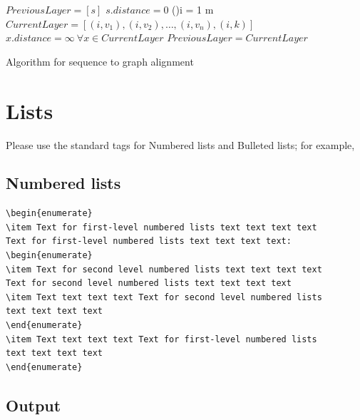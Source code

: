 \documentclass[]{imag-ms-template}
\begin{document}
\begin{algorithm}[h!]
\SetAlgoLined
{}
 $PreviousLayer=[s]$\;
 $s.distance = 0$\;
 \For(){i = 1 \KwTo m}{
   $CurrentLayer = [(i,v_1),(i,v_{2}),\ldots, (i,v_{n}), (i,k)]$\;
   $x.distance = \infty \ \forall  x \in CurrentLayer$\;
   \;
   \;
   $PreviousLayer = CurrentLayer$\;
 }
 \;
 \caption{Algorithm for sequence to graph alignment}
 \label{algo:linear}
\end{algorithm}

\section{Lists}

Please use the standard tags for Numbered lists and Bulleted lists; for example,

\subsection*{Numbered lists}

\begin{verbatim}
\begin{enumerate}
\item Text for first-level numbered lists text text text text
Text for first-level numbered lists text text text text: 
\begin{enumerate}
\item Text for second level numbered lists text text text text
Text for second level numbered lists text text text text 
\item Text text text text Text for second level numbered lists
text text text text 
\end{enumerate}
\item Text text text text Text for first-level numbered lists
text text text text 
\end{enumerate}
\end{verbatim}

\subsection*{Output}
\end{document}
